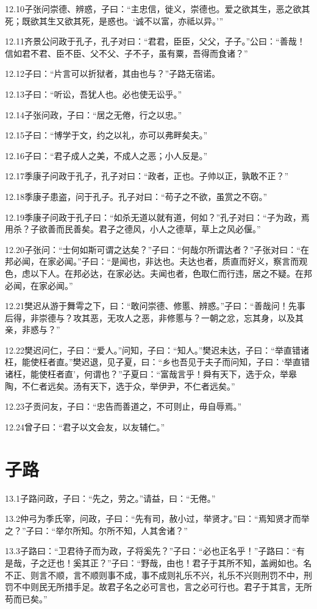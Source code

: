 \documentclass[a4paper,12pt,UTF8,twoside]{ctexbook}
\begin{document}
12.10子张问崇德、辨惑，子曰：“主忠信，徙义，崇德也。爱之欲其生，恶之欲其死；既欲其生又欲其死，是惑也。‘诚不以富，亦祗以异。’”

12.11齐景公问政于孔子，孔子对曰：“君君，臣臣，父父，子子。”公曰：“善哉！信如君不君、臣不臣、父不父、子不子，虽有粟，吾得而食诸？”

12.12子曰：“片言可以折狱者，其由也与？”子路无宿诺。

12.13子曰：“听讼，吾犹人也。必也使无讼乎。”

12.14子张问政，子曰：“居之无倦，行之以忠。”

12.15子曰：“博学于文，约之以礼，亦可以弗畔矣夫。”

12.16子曰：“君子成人之美，不成人之恶；小人反是。”

12.17季康子问政于孔子，孔子对曰：“政者，正也。子帅以正，孰敢不正？”

12.18季康子患盗，问于孔子。孔子对曰：“苟子之不欲，虽赏之不窃。”

12.19季康子问政于孔子曰：“如杀无道以就有道，何如？”孔子对曰：“子为政，焉用杀？子欲善而民善矣。君子之德风，小人之德草，草上之风必偃。”

12.20子张问：“士何如斯可谓之达矣？”子曰：“何哉尔所谓达者？”子张对曰：“在邦必闻，在家必闻。”子曰：“是闻也，非达也。夫达也者，质直而好义，察言而观色，虑以下人。在邦必达，在家必达。夫闻也者，色取仁而行违，居之不疑。在邦必闻，在家必闻。”

12.21樊迟从游于舞雩之下，曰：“敢问崇德、修慝、辨惑。”子曰：“善哉问！先事后得，非崇德与？攻其恶，无攻人之恶，非修慝与？一朝之忿，忘其身，以及其亲，非惑与？”

12.22樊迟问仁，子曰：“爱人。”问知，子曰：“知人。”樊迟未达，子曰：“举直错诸枉，能使枉者直。”樊迟退，见子夏，曰：“乡也吾见于夫子而问知，子曰：‘举直错诸枉，能使枉者直’，何谓也？”子夏曰：“富哉言乎！舜有天下，选于众，举皋陶，不仁者远矣。汤有天下，选于众，举伊尹，不仁者远矣。”

12.23子贡问友，子曰：“忠告而善道之，不可则止，毋自辱焉。”

12.24曾子曰：“君子以文会友，以友辅仁。”

\chapter{子路}
13.1子路问政，子曰：“先之，劳之。”请益，曰：“无倦。”

13.2仲弓为季氏宰，问政，子曰：“先有司，赦小过，举贤才。”曰：“焉知贤才而举之？”子曰：“举尔所知。尔所不知，人其舍诸？”

13.3子路曰：“卫君待子而为政，子将奚先？”子曰：“必也正名乎！”子路曰：“有是哉，子之迂也！奚其正？”子曰：“野哉，由也！君子于其所不知，盖阙如也。名不正、则言不顺，言不顺则事不成，事不成则礼乐不兴，礼乐不兴则刑罚不中，刑罚不中则民无所措手足。故君子名之必可言也，言之必可行也。君子于其言，无所苟而已矣。”
\end{document}
